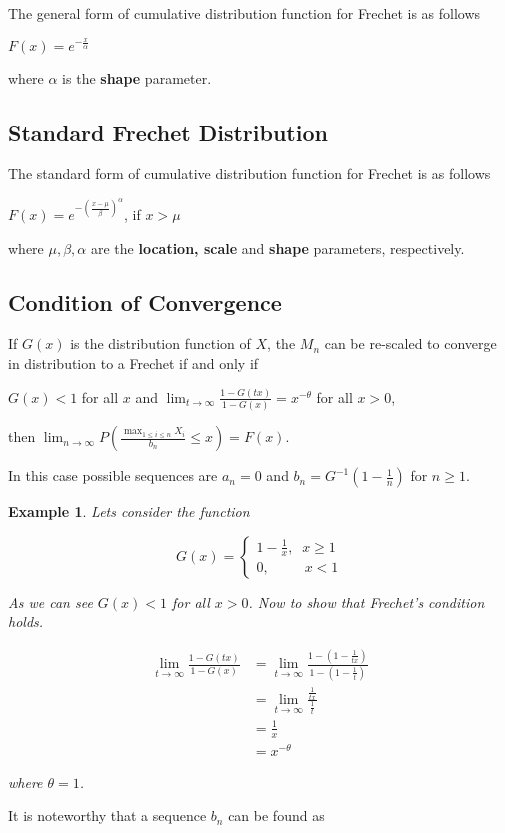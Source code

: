 \documentclass[11pt,a4paper]{article}
\theoremstyle{plain}
\newtheorem{exmp}[fact]{Example}
\begin{document}
The general form of cumulative distribution function for Frechet is as follows
\begin{center}
$F(x)=e^{-\frac{x}{\alpha}}$
\end{center}
where $\alpha$ is the \textbf{shape} parameter.


\subsection*{Standard Frechet Distribution}
The standard form of cumulative distribution function for Frechet is as follows
\begin{center}
$F(x)=e^{-(\frac{x-\mu}{\beta})^{\alpha}}$, \;\; if $x>\mu$
\end{center}
where $\mu,\beta,\alpha$ are the \textbf{location, scale} and \textbf{shape} parameters, respectively.

\newpage
\subsection*{Condition of Convergence}
If $G(x)$ is the distribution function of $X$, the $M_n$ can be re-scaled to converge in distribution to a Frechet if and only if
\begin{center}
$G(x)<1$ for all $x$ and $\lim_{t \rightarrow \infty}\frac{1-G(tx)}{1-G(x) }=x^{-\theta}$ for all $x>0$,
\end{center}
\begin{center}
then $\lim_{n \rightarrow \infty}P(\frac{\max_{1 \leq i \leq n}X_i}{b_n}\leq x)=F(x)$.
\end{center}
In this case possible sequences are $a_n=0$ and $b_n=G^{-1}(1-\frac{1}{n})$ for $n \geq 1$.

\begin{exmp}
Lets consider the function
\begin{center}
\[
  G(x)=\left\{
  \begin{array}{ll}
  1-\frac{1}{x},\;\; x\geq 1\\
  0,\;\;\;\;\;\;\;\;\; x<1
  \end{array}
  \right.
  \]
\end{center}
As we can see $G(x)<1$ for all $x>0$. Now to show that Frechet's condition holds.

\begin{center}

\begin{equation*}
\begin{split}
\lim_{t \rightarrow \infty}\frac{1-G(tx)}{1-G(x) } & =\lim_{t \rightarrow \infty}\frac{1-(1-\frac{1}{tx})}{1-(1-\frac{1}{t}) }\\
& = \lim_{t \rightarrow \infty}\frac{\frac{1}{tx}}{\frac{1}{t}}\\
& = \frac{1}{x}\\
& = x^{-\theta}
\end{split}
\end{equation*}
\end{center}
where $\theta = 1$.
\end{exmp}
It is noteworthy that a sequence $b_n$ can be found as
\end{document}
